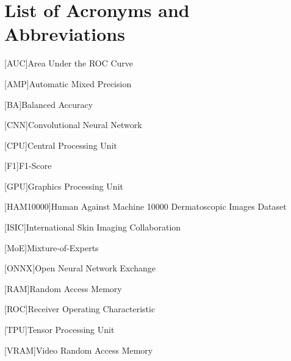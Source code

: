 \chapter*{List of Acronyms and Abbreviations}
\begin{acronym}[HAM10000]

[AUC]{Area Under the ROC Curve}
\medskip

[AMP]{Automatic Mixed Precision}
\medskip

[BA]{Balanced Accuracy}
\medskip

[CNN]{Convolutional Neural Network}
\medskip

[CPU]{Central Processing Unit}
\medskip

[F1]{F1-Score}
\medskip

[GPU]{Graphics Processing Unit}
\medskip

[HAM10000]{Human Against Machine 10000 Dermatoscopic Images Dataset}
\medskip

[ISIC]{International Skin Imaging Collaboration}
\medskip

[MoE]{Mixture-of-Experts}
\medskip

[ONNX]{Open Neural Network Exchange}
\medskip

[RAM]{Random Access Memory}
\medskip

[ROC]{Receiver Operating Characteristic}
\medskip

[TPU]{Tensor Processing Unit}
\medskip

[VRAM]{Video Random Access Memory}
\medskip

\end{acronym}